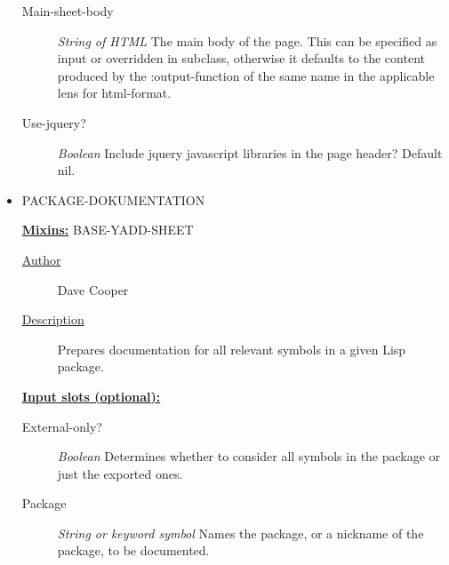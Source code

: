 \documentclass [11pt]{book}
\begin{document}
\begin{itemize}
\begin{description}
\item [Main-sheet-body]
\emph{String of HTML} The main body of the page.
This can be specified as input or overridden in subclass, otherwise it defaults
to the content produced by the :output-function of the same name
in the applicable lens for  html-format.


\item [Use-jquery?]
\emph{Boolean} Include jquery javascript libraries in the page header?
Default nil.


\end{description}







\item {}PACKAGE-DOKUMENTATION


\textbf{
\underline{Mixins:}} BASE-YADD-SHEET





\begin{description}

\item [
\underline{Author}]


Dave Cooper



\item [
\underline{Description}]


Prepares documentation for all relevant symbols in a given Lisp package.



\end{description}








\textbf{
\underline{Input slots (optional):}}

\begin{description}

\item [External-only?]
\emph{Boolean} Determines whether to consider all symbols in the package or just the exported ones.


\item [Package]
\emph{String or keyword symbol} Names the package, or a nickname of the package, to be documented.



\end{description}
\end{itemize}
\end{document}
